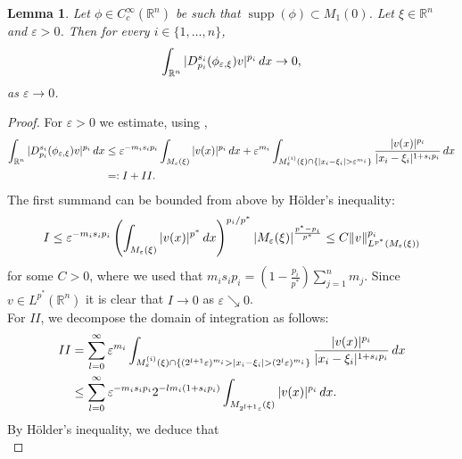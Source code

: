 \documentclass[11pt]{amsart}
\theoremstyle{plain}
\newtheorem{lemma}[theorem]{Lemma}
\theoremstyle{definition}
\numberwithin{equation}{section}
\renewcommand{\d}{\textnormal{d}}
\newcommand{\R}{\mathbb{R}}
\DeclareMathOperator{\supp}{supp}
\newcommand{\eps}{\varepsilon}
\begin{document}
\begin{lemma}
\label{lem:epslimit}
Let $\phi \in C_c^{\infty}(\R^n)$ be such that $\supp(\phi) \subset M_1(0)$. Let $\xi \in \R^n$ and $\eps > 0$. Then for every $i \in \{1,\dots,n\}$,
\begin{equation*}
\int_{\R^n} \vert D_{p_i}^{s_i} (\phi_{\eps,\xi})v\vert^{p_i} \, \d x \to 0,
\end{equation*}
as $\eps \to 0$.
\end{lemma}

\begin{proof}
For $\eps > 0$ we estimate, using ,
\begin{equation*}
\begin{split}
\int_{\R^n} \vert D_{p_i}^{s_i} (\phi_{\eps,\xi})v\vert^{p_i} \, \d x &\le \eps^{-m_is_ip_i} \int_{M_{\eps}(\xi)}  \vert v(x) \vert^{p_i} \, \d x + \eps^{m_i}\int_{M_{\eps}^{(i)}(\xi) \cap \{\vert x_i - \xi_i \vert > \eps^{m_i}\}} \frac{\vert v (x) \vert^{p_i}}{\vert x_i - \xi_i \vert^{1+s_ip_i}} \, \d x\\
&=: I + II.
\end{split}
\end{equation*}
The first summand can be bounded from above by H\"older's inequality:
\begin{equation*}
I \le \eps^{-m_is_ip_i}\left(\int_{M_{\eps}(\xi)} \vert v(x) \vert^{p^{\ast}} \, \d x\right)^{p_i/p^{\ast}} \vert M_{\eps}(\xi)\vert^{\frac{p^{\ast}-p_i}{p^{\ast}}} \le C \Vert v \Vert_{L^{p^{\ast}}(M_{\eps}(\xi))}^{p_i}
\end{equation*}
for some $C>0$, where we used that $m_is_ip_i = \left(1-\frac{p_i}{p^{\ast}}\right)\sum_{j =1}^n m_j$. Since $v \in L^{p^{\ast}}(\R^n)$ it is clear that $I \to 0$ as $\eps \searrow 0$.\\
For $II$, we decompose the domain of integration as follows:
\begin{equation*}
\begin{split}
II &= \sum_{l = 0}^{\infty} \eps^{m_i}\int_{M^{(i)}_{\eps}(\xi) \cap \{(2^{l+1}\eps)^{m_i} >\vert x_i - \xi_i \vert > (2^l\eps)^{m_i}\}} \frac{\vert v (x) \vert^{p_i}}{\vert x_i - \xi_i \vert^{1+s_ip_i}} \, \d x\\
&\le \sum_{l = 0}^{\infty} \eps^{-m_is_ip_i} 2^{-l m_i(1+s_ip_i)} \int_{M_{2^{l+1}\eps}(\xi)} \vert v(x) \vert^{p_i} \, \d x.
\end{split}
\end{equation*}
By H\"older's inequality, we deduce that
\begin{equation*}

\end{equation*}
\end{proof}
\end{document}
